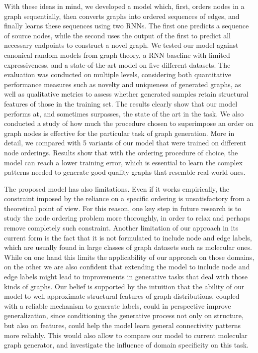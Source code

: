 With these ideas in mind, we developed a model which, first, orders nodes in a graph sequentially, then converts graphs into ordered sequences of edges, and finally learns these sequences using two RNNs. The first one predicts a sequence of source nodes, while the second uses the output of the first to predict all necessary endpoints to construct a novel graph. We tested our model against canonical random models from graph theory, a RNN baseline with limited expressiveness, and a state-of-the-art model on five different datasets. The evaluation was conducted on multiple levels, considering both quantitative performance measures such as novelty and uniqueness of generated graphs, as well as qualitative metrics to assess whether generated samples retain structural features of those in the training set. The results clearly show that our model performs at, and sometimes surpasses, the state of the art in the task.
We also conducted a study of how much the procedure chosen to superimpose an order on graph nodes is effective for the particular task of graph generation. More in detail, we compared with 5 variants of our model that were trained on different node orderings. Results show that with the ordering procedure of choice, the model can reach a lower training error, which is essential to learn the complex patterns needed to generate good quality graphs that resemble real-world ones.

The proposed model has also limitations. Even if it works empirically, the constraint imposed by the reliance on a specific ordering is unsatisfactory from a theoretical point of view. For this reason, one key step in future research is to study the node ordering problem more thoroughly, in order to relax and perhaps remove completely such constraint. Another limitation of our approach in its current form is the fact that it is not formulated to include node and edge labels, which are usually found in large classes of graph datasets such as molecular ones. While on one hand this limits the applicability of our approach on those domains, on the other we are also confident that extending the model to include node and edge labels might lead to improvements in generative tasks that deal with those kinds of graphs. Our belief is supported by the intuition that the ability of our model to well approximate structural features of graph distributions, coupled with a reliable mechanism to generate labels, could in perspective improve generalization, since conditioning the generative process not only on structure, but also on features, could help the model learn general connectivity patterns more reliably. This would also allow to compare our model to current molecular graph generator, and investigate the influence of domain specificity on this task.

